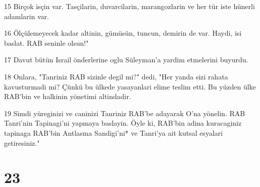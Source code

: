 \par 15 Birçok isçin var. Tasçilarin, duvarcilarin, marangozlarin ve her tür iste hünerli adamlarin var.
\par 16 Ölçülemeyecek kadar altinin, gümüsün, tuncun, demirin de var. Haydi, isi baslat. RAB seninle olsun!"
\par 17 Davut bütün Israil önderlerine oglu Süleyman'a yardim etmelerini buyurdu.
\par 18 Onlara, "Tanriniz RAB sizinle degil mi?" dedi, "Her yanda sizi rahata kavusturmadi mi? Çünkü bu ülkede yasayanlari elime teslim etti. Bu yüzden ülke RAB'bin ve halkinin yönetimi altindadir.
\par 19 Simdi yüreginizi ve caninizi Tanriniz RAB'be adayarak O'na yönelin. RAB Tanri'nin Tapinagi'ni yapmaya baslayin. Öyle ki, RAB'bin adina kuracaginiz tapinaga RAB'bin Antlasma Sandigi'ni* ve Tanri'ya ait kutsal esyalari getiresiniz."

\chapter{23}

